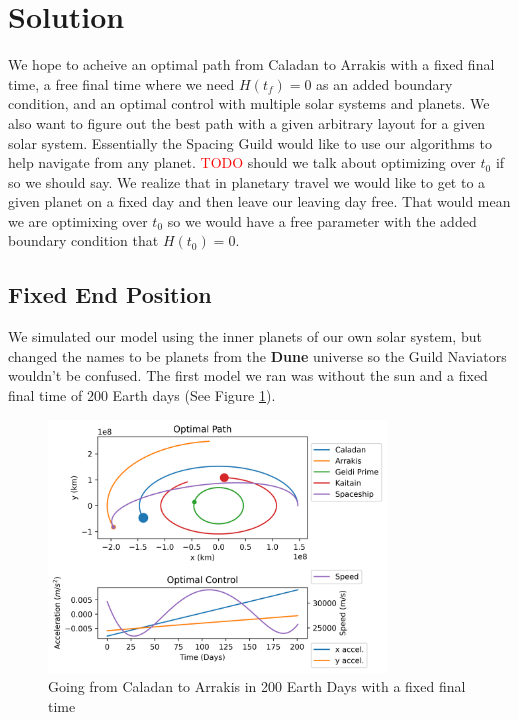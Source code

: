 \documentclass[11pt]{amsart}
\begin{document}
\section{Solution}
We hope to acheive an optimal path from Caladan to Arrakis with a fixed final time, a free final time where we need $H(t_f) = 0$ as an added boundary condition, and an optimal control
with multiple solar systems and planets. We also want to figure out the best path with a given arbitrary layout for a given solar system. Essentially the Spacing Guild would like to use 
our algorithms to help navigate from any planet. \textcolor{red}{TODO} should we talk about optimizing over $t_0$ if so we should say. We realize that in planetary travel we would like to 
get to a given planet on a fixed day and then leave our leaving day free. That would mean we are optimixing over $t_0$ so we would have a free parameter with the added boundary condition that
$H(t_0) = 0$.

\subsection{Fixed End Position}

We simulated our model using the inner planets of our own solar system, but changed the names to be planets from the \textbf{Dune} universe so the Guild Naviators wouldn't be confused.
The first model we ran was without the sun and a fixed final time of $200$ Earth days (See Figure \ref{fig:fixed_time_no_sun}). 

\begin{figure}[htp]
    \centering
    \includegraphics[width=0.8\textwidth]{f2.png}\hfill
    \caption{Going from Caladan to Arrakis in 200 Earth Days with a fixed final time}
    \label{fig:fixed_time_no_sun}
\end{figure}
\end{document}
